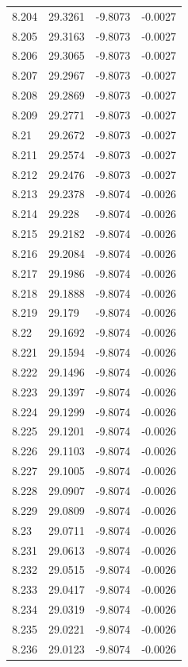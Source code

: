 \begin{tabular}{llll}
8.204 & 29.3261 & -9.8073 & -0.0027 \\
8.205 & 29.3163 & -9.8073 & -0.0027 \\
8.206 & 29.3065 & -9.8073 & -0.0027 \\
8.207 & 29.2967 & -9.8073 & -0.0027 \\
8.208 & 29.2869 & -9.8073 & -0.0027 \\
8.209 & 29.2771 & -9.8073 & -0.0027 \\
8.21 & 29.2672 & -9.8073 & -0.0027 \\
8.211 & 29.2574 & -9.8073 & -0.0027 \\
8.212 & 29.2476 & -9.8073 & -0.0027 \\
8.213 & 29.2378 & -9.8074 & -0.0026 \\
8.214 & 29.228 & -9.8074 & -0.0026 \\
8.215 & 29.2182 & -9.8074 & -0.0026 \\
8.216 & 29.2084 & -9.8074 & -0.0026 \\
8.217 & 29.1986 & -9.8074 & -0.0026 \\
8.218 & 29.1888 & -9.8074 & -0.0026 \\
8.219 & 29.179 & -9.8074 & -0.0026 \\
8.22 & 29.1692 & -9.8074 & -0.0026 \\
8.221 & 29.1594 & -9.8074 & -0.0026 \\
8.222 & 29.1496 & -9.8074 & -0.0026 \\
8.223 & 29.1397 & -9.8074 & -0.0026 \\
8.224 & 29.1299 & -9.8074 & -0.0026 \\
8.225 & 29.1201 & -9.8074 & -0.0026 \\
8.226 & 29.1103 & -9.8074 & -0.0026 \\
8.227 & 29.1005 & -9.8074 & -0.0026 \\
8.228 & 29.0907 & -9.8074 & -0.0026 \\
8.229 & 29.0809 & -9.8074 & -0.0026 \\
8.23 & 29.0711 & -9.8074 & -0.0026 \\
8.231 & 29.0613 & -9.8074 & -0.0026 \\
8.232 & 29.0515 & -9.8074 & -0.0026 \\
8.233 & 29.0417 & -9.8074 & -0.0026 \\
8.234 & 29.0319 & -9.8074 & -0.0026 \\
8.235 & 29.0221 & -9.8074 & -0.0026 \\
8.236 & 29.0123 & -9.8074 & -0.0026 \\

\end{tabular}
